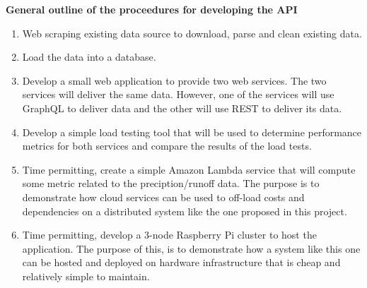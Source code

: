 \textbf{General outline of the proceedures for developing the API}
\begin{enumerate}
\item Web scraping existing data source to download, parse and clean existing data.
\item Load the data into a database.  
\item Develop a small web application to provide two web services.  The two 
services will deliver the same data.  However, one of the services will use 
GraphQL\cite{hid505FacebookGraphQL2018} to deliver data and the other will use REST\cite{hid505swaggerio2018}
to deliver its data. 
\item Develop a simple load testing tool that will be used to determine 
performance metrics for both services and compare the results of the load tests.
\item Time permitting, create a simple Amazon Lambda service that will compute 
some metric related to the preciption/runoff data.  The purpose is to 
demonstrate how cloud services can be used to off-load costs and dependencies 
on a distributed system like the one proposed in this project.
\item Time permitting, develop a 3-node Raspberry Pi cluster to host the 
application.  The purpose of this, is to demonstrate how a system like this 
one can be hosted and deployed on hardware infrastructure that is cheap and 
relatively simple to maintain.
\end{enumerate}

